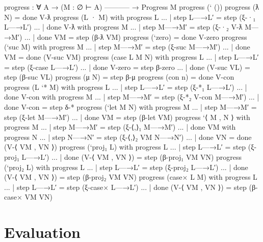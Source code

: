 \begin{fence}
\begin{code}
progress : ∀ {A}
  → (M : ∅ ⊢ A)
    -----------
  → Progress M
progress (` ())
progress (ƛ N)                              =  done V-ƛ
progress (L · M) with progress L
...    | step L—→L′                         =  step (ξ-·₁ L—→L′)
...    | done V-ƛ with progress M
...        | step M—→M′                     =  step (ξ-·₂ V-ƛ M—→M′)
...        | done VM                        =  step (β-ƛ VM)
progress (`zero)                            =  done V-zero
progress (`suc M) with progress M
...    | step M—→M′                         =  step (ξ-suc M—→M′)
...    | done VM                            =  done (V-suc VM)
progress (case L M N) with progress L
...    | step L—→L′                         =  step (ξ-case L—→L′)
...    | done V-zero                        =  step β-zero
...    | done (V-suc VL)                    =  step (β-suc VL)
progress (μ N)                              =  step β-μ
progress (con n)                            =  done V-con
progress (L `* M) with progress L
...    | step L—→L′                         =  step (ξ-*₁ L—→L′)
...    | done V-con with progress M
...        | step M—→M′                     =  step (ξ-*₂ V-con M—→M′)
...        | done V-con                     =  step δ-*
progress (`let M N) with progress M
...    | step M—→M′                         =  step (ξ-let M—→M′)
...    | done VM                            =  step (β-let VM)
progress `⟨ M , N ⟩ with progress M
...    | step M—→M′                         =  step (ξ-⟨,⟩₁ M—→M′)
...    | done VM with progress N
...        | step N—→N′                     =  step (ξ-⟨,⟩₂ VM N—→N′)
...        | done VN                        =  done (V-⟨ VM , VN ⟩)
progress (`proj₁ L) with progress L
...    | step L—→L′                         =  step (ξ-proj₁ L—→L′)
...    | done (V-⟨ VM , VN ⟩)               =  step (β-proj₁ VM VN)
progress (`proj₂ L) with progress L
...    | step L—→L′                         =  step (ξ-proj₂ L—→L′)
...    | done (V-⟨ VM , VN ⟩)               =  step (β-proj₂ VM VN)
progress (case× L M) with progress L
...    | step L—→L′                         =  step (ξ-case× L—→L′)
...    | done (V-⟨ VM , VN ⟩)               =  step (β-case× VM VN)
\end{code}
\end{fence}

\hypertarget{evaluation}{%
\section{Evaluation}\label{evaluation}}

